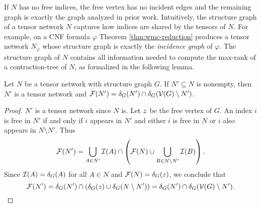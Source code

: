 If $N$ has no free indices, the free vertex has no incident edges and the remaining graph is exactly the graph analyzed in prior work. Intuitively, the structure graph of a tensor network $N$ captures how indices are shared by the tensors of $N$. For example, on a CNF formula $\varphi$ Theorem \ref{thm:wmc-reduction} produces a tensor network $N_\varphi$ whose structure graph is exactly the \emph{incidence graph} of $\varphi$. The structure graph of $N$ contains all information needed to compute the max-rank of a contraction-tree of $N$, as formalized in the following lemma.
\begin{lemma} \label{lemma:tcn-equiv-structure}
	Let $N$ be a tensor network with structure graph $G$. If $N' \subseteq N$ is nonempty, then $N'$ is a tensor network and $\mathcal{F}(N') = \delta_{G}(N') \cap \delta_{G}(\mathcal{V}(G) \setminus N')$. %
\end{lemma}
\begin{proof}
	$N'$ is a tensor network since $N$ is. Let $z$ be the free vertex of $G$.
	An index $i$ is free in $N'$ if and only if $i$ appears in $N'$ and either $i$ is free in $N$ or $i$ also appears in $N \setminus N'$. Thus
    $$\mathcal{F}(N') = \bigcup_{A \in N'} \mathcal{I}(A) \cap \left( \mathcal{F}(N) \cup \bigcup_{B \in N \setminus N'} \mathcal{I}(B) \right).$$
	Since $\mathcal{I}(A) = \delta_{G}(A)$ for all $A \in N$ and $\mathcal{F}(N) = \delta_{G}(z)$, we conclude that
	$$\mathcal{F}(N') = \delta_{G}(N') \cap (\delta_{G}(z) \cup \delta_{G}(N \setminus N')) =  \delta_{G}(N') \cap \delta_{G}(\mathcal{V}(G) \setminus N').$$
\end{proof}




